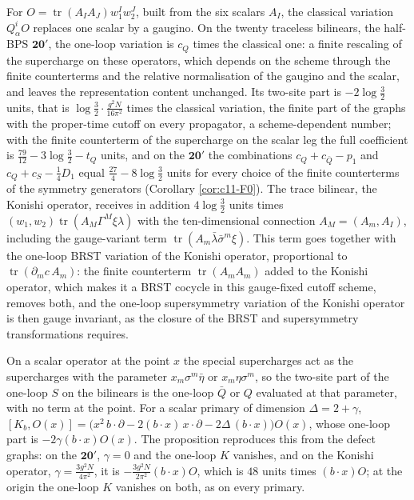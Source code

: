 \begin{remark}
For $O=\operatorname{tr}(A_IA_J)w_1^Iw_2^J$, built from the six scalars $A_I$, the classical variation $Q^i_\alpha O$ replaces one scalar by a gaugino. On the twenty traceless bilinears, the half-BPS $\mathbf{20'}$, the one-loop variation is $c_Q$ times the classical one: a finite rescaling of the supercharge on these operators, which depends on the scheme through the finite counterterms and the relative normalisation of the gaugino and the scalar, and leaves the representation content unchanged. Its two-site part is $-2\log\tfrac32$ units, that is $\log\tfrac32\cdot\frac{g^2N}{16\pi^2}$ times the classical variation, the finite part of the graphs with the proper-time cutoff on every propagator, a scheme-dependent number; with the finite counterterm of the supercharge on the scalar leg the full coefficient is $\tfrac{79}{12}-3\log\tfrac32-t_Q$ units, and on the $\mathbf{20'}$ the combinations $c_Q+c_{\bar Q}-p_1$ and $c_Q+c_S-\tfrac14D_1$ equal $\tfrac{27}4-8\log\tfrac32$ units for every choice of the finite counterterms of the symmetry generators (Corollary \ref{cor:c11-F0}). The trace bilinear, the Konishi operator, receives in addition $4\log\tfrac32$ units times $(w_1,w_2)\operatorname{tr}(A_M\Gamma^M\xi\lambda)$ with the ten-dimensional connection $A_M=(A_m,A_I)$, including the gauge-variant term $\operatorname{tr}(A_m\bar\lambda\bar\sigma^m\xi)$. This term goes together with the one-loop BRST variation of the Konishi operator, proportional to $\operatorname{tr}(\partial_mc\,A_m)$: the finite counterterm $\operatorname{tr}(A_mA_m)$ added to the Konishi operator, which makes it a BRST cocycle in this gauge-fixed cutoff scheme, removes both, and the one-loop supersymmetry variation of the Konishi operator is then gauge invariant, as the closure of the BRST and supersymmetry transformations requires.
\end{remark}

\begin{remark}
On a scalar operator at the point $x$ the special supercharges act as the supercharges with the parameter $x_m\sigma^m\bar\eta$ or $x_m\eta\sigma^m$, so the two-site part of the one-loop $S$ on the bilinears is the one-loop $\bar Q$ or $Q$ evaluated at that parameter, with no term at the point. For a scalar primary of dimension $\Delta=2+\gamma$, $[K_b,O(x)]=\big(x^2\,b\cdot\partial-2(b\cdot x)\,x\cdot\partial-2\Delta\,(b\cdot x)\big)O(x)$, whose one-loop part is $-2\gamma(b\cdot x)O(x)$. The proposition reproduces this from the defect graphs: on the $\mathbf{20'}$, $\gamma=0$ and the one-loop $K$ vanishes, and on the Konishi operator, $\gamma=\frac{3g^2N}{4\pi^2}$, it is $-\frac{3g^2N}{2\pi^2}(b\cdot x)O$, which is $48$ units times $(b\cdot x)O$; at the origin the one-loop $K$ vanishes on both, as on every primary.
\end{remark}


